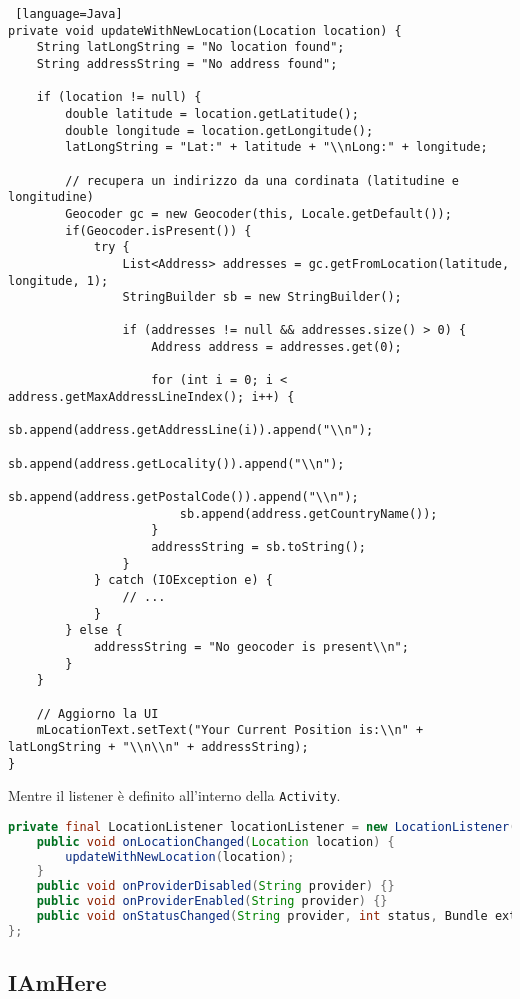 \begin{lstlisting} [language=Java]
private void updateWithNewLocation(Location location) {             
	String latLongString = "No location found";
	String addressString = "No address found";

	if (location != null) {
		double latitude = location.getLatitude();
		double longitude = location.getLongitude();
		latLongString = "Lat:" + latitude + "\\nLong:" + longitude;

		// recupera un indirizzo da una cordinata (latitudine e longitudine)
		Geocoder gc = new Geocoder(this, Locale.getDefault());
		if(Geocoder.isPresent()) {
			try {
				List<Address> addresses = gc.getFromLocation(latitude, longitude, 1);
				StringBuilder sb = new StringBuilder();

				if (addresses != null && addresses.size() > 0) {
					Address address = addresses.get(0);

					for (int i = 0; i < address.getMaxAddressLineIndex(); i++) {
						sb.append(address.getAddressLine(i)).append("\\n");
						sb.append(address.getLocality()).append("\\n");
						sb.append(address.getPostalCode()).append("\\n");
						sb.append(address.getCountryName());
					}
					addressString = sb.toString();
				}
			} catch (IOException e) {
				// ...
			}
		} else {
			addressString = "No geocoder is present\\n";
		}
	}

	// Aggiorno la UI
	mLocationText.setText("Your Current Position is:\\n" + latLongString + "\\n\\n" + addressString);
}
\end{lstlisting}

Mentre il listener è definito all'interno della \lstinline|Activity|.
\begin{lstlisting}[language=Java]
private final LocationListener locationListener = new LocationListener() {
	public void onLocationChanged(Location location) {
		updateWithNewLocation(location);
	}
	public void onProviderDisabled(String provider) {}
	public void onProviderEnabled(String provider) {}
	public void onStatusChanged(String provider, int status, Bundle extras) {}
};
\end{lstlisting}


\subsection{IAmHere}

